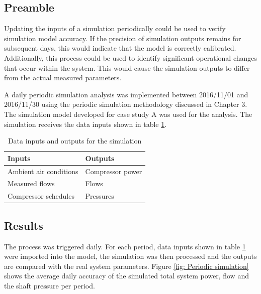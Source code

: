 	\subsection{Preamble}
	Updating the inputs of a simulation periodically could be used to verify simulation model accuracy. If the precision of simulation outputs remains for subsequent days, this would indicate that the model is correctly calibrated. Additionally, this process could be used to identify significant operational changes that occur within the system. This would cause the simulation outputs to differ from the actual measured parameters. 
	\par 
	A daily periodic simulation  analysis was implemented between 2016/11/01 and 2016/11/30 using the periodic simulation methodology discussed in Chapter 3. The simulation model developed for case study A was used for the analysis. The simulation receives the data inputs shown in table \ref{table: Periodic inputs/outputs}.
	\begin{table}[h]
		\centering
		\begin{tabular}{ll}
			\hline
			Inputs \hspace*{4cm}    &Outputs \hspace*{4cm}    \\  \hline
			Ambient air conditions&Compressor power \\
			Measured flows& Flows \\
			Compressor schedules& Pressures \\
			\hline
		\end{tabular}
		\caption{Data inputs and outputs for the simulation}
		\label{table: Periodic inputs/outputs}
	\end{table}

\subsection{Results}

 The process was triggered daily. For each period, data inputs shown in table \ref{table: Periodic inputs/outputs} were imported into the model, the simulation was then processed and the outputs are compared with the real system parameters. Figure \ref{fig: Periodic simulation} shows the average daily accuracy of the simulated total system power, flow and the shaft pressure per period.
	     \par 
     
